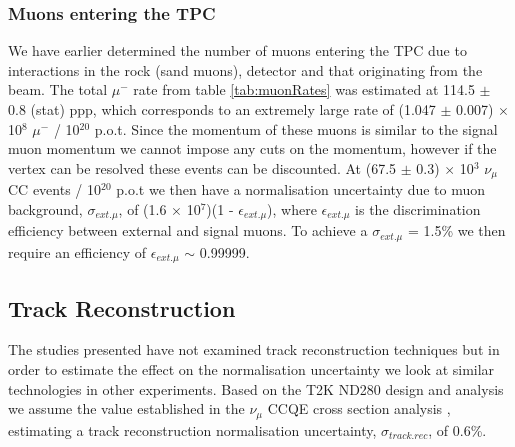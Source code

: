 \subsubsection{Muons entering the TPC}
We have earlier determined the number of muons entering the TPC due to interactions in the rock (sand muons), detector and that originating from the beam. The total $\mu^{-}$ rate from table \ref{tab:muonRates} was estimated at 114.5 $\pm$ 0.8 (stat) ppp, which corresponds to an extremely large rate of (1.047 $\pm$ 0.007) $\times$ 10$^{8}$ $\mu^{-}$ / 10$^{20}$ p.o.t. Since the momentum of these muons is similar to the signal muon momentum we cannot impose any cuts on the momentum, however if the vertex can be resolved these events can be discounted. At (67.5 $\pm$ 0.3) $\times$ 10$^{3}$ $\nu_{\mu}$ CC events / 10$^{20}$ p.o.t we then have a normalisation uncertainty due to muon background, $\sigma_{ext. \mu}$, of (1.6 $\times$ 10$^{7}$)(1 - $\epsilon_{ext. \mu}$), where $\epsilon_{ext. \mu}$ is the discrimination efficiency between external and signal muons. To achieve a $\sigma_{ext. \mu}$ = 1.5\% we then require an efficiency of $\epsilon_{ext. \mu}$ $\sim$ 0.99999.

\subsection{Track Reconstruction}
The studies presented have not examined track reconstruction techniques but in order to estimate the effect on the normalisation uncertainty we look at similar technologies in other experiments. Based on the T2K ND280 design and analysis we assume the value established in the $\nu_{\mu}$ CCQE cross section analysis \cite{t2kND280ccqeXSecPaper}, estimating a track reconstruction normalisation uncertainty, $\sigma_{track.rec}$, of 0.6\%. 

